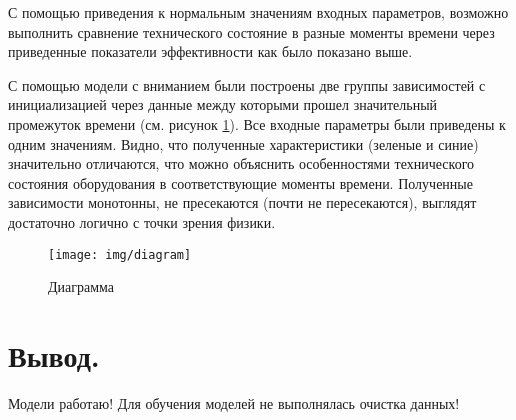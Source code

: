 \documentclass[12pt,a4paper]{article}
\begin{document}
С помощью приведения к нормальным значениям входных параметров, возможно выполнить сравнение технического состояние в разные моменты времени через приведенные показатели эффективности как было показано выше.

%
%

С помощью модели с вниманием были построены две группы зависимостей с инициализацией через данные между которыми прошел значительный промежуток времени (см. рисунок \ref{fig:diagram}). Все входные параметры были приведены к одним значениям. Видно, что полученные характеристики (зеленые и синие) значительно отличаются, что можно объяснить особенностями технического состояния оборудования в соответствующие моменты времени. Полученные зависимости монотонны, не пресекаются (почти не пересекаются), выглядят достаточно логично с точки зрения физики.

\begin{figure}[htbp]
	\centering\texttt{[image: img/diagram]}
	\caption{Диаграмма}
	\label{fig:diagram}
\end{figure}

\newpage
\section{Вывод.}

Модели работаю! Для обучения моделей не выполнялась очистка данных!

%
\end{document}
